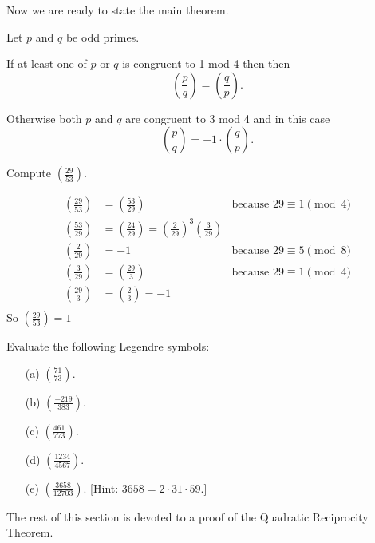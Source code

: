 \documentclass[oneside,12pt]{amsart}
\begin{document}
Now we are ready to state the main theorem.

\begin{theorem}
\label{QuadraticReciprocity}
Let $p$ and $q$ be odd primes. 

If at least one of $p$ or $q$ is congruent to 1 mod 4 then then 
$$\left( \frac{p}{q} \right) = \left( \frac{q}{p} \right).$$

Otherwise both $p$ and $q$ are congruent to 3 mod 4 and in this case
$$\left( \frac{p}{q} \right) = -1 \cdot \left( \frac{q}{p} \right).$$
\end{theorem}

\begin{example}
Compute $\left( \frac{29}{53} \right)$.

\begin{align*}
\left( \frac{29}{53} \right) &= \left( \frac{53}{29} \right) \quad &\text{because $29\equiv 1 \pmod 4$} \\
\left( \frac{53}{29} \right) &= \left( \frac{24}{29} \right) =  \left( \frac{2}{29} \right)^3 \left( \frac{3}{29} \right)\\
\left( \frac{2}{29} \right) &= -1 \quad &\text{because $29\equiv 5 \pmod 8$} \\
\left( \frac{3}{29} \right) &= \left( \frac{29}{3} \right) \quad &\text{because $29\equiv 1 \pmod 4$} \\
\left( \frac{29}{3} \right) &= \left( \frac{2}{3} \right) = -1 \\
\end{align*}
So $\left( \frac{29}{53} \right) = 1$

\end{example}


\begin{homework}
Evaluate the following Legendre symbols:
\begin{enumerate}
\item[(a)] $\left( \frac{71}{73} \right)$.
\item[(b)] $\left( \frac{-219}{383} \right)$.
\item[(c)] $\left( \frac{461}{773} \right)$.
\item[(d)] $\left( \frac{1234}{4567} \right)$.
\item[(e)] $\left( \frac{3658}{12703} \right)$.
[Hint: $3658 = 2 \cdot 31 \cdot 59$.]
\end{enumerate}
\end{homework}

The rest of this section is devoted to a proof of the Quadratic Reciprocity Theorem.
\end{document}

